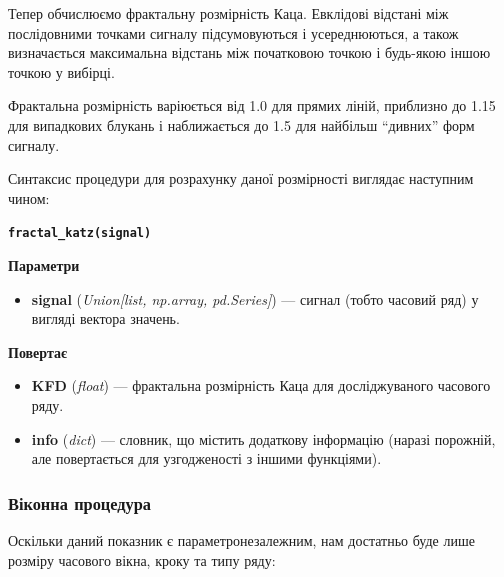 \documentclass[
  letterpaper,
]{report}
\providecommand{\tightlist}{%
  \setlength{\itemsep}{0pt}\setlength{\parskip}{0pt}}\usepackage{longtable,booktabs,array}
\begin{document}
Тепер обчислюємо фрактальну розмірність Каца. Евклідові відстані між
послідовними точками сигналу підсумовуються і усереднюються, а також
визначається максимальна відстань між початковою точкою і будь-якою
іншою точкою у вибірці.

Фрактальна розмірність варіюється від 1.0 для прямих ліній, приблизно до
1.15 для випадкових блукань і наближається до 1.5 для найбільш
``дивних'' форм сигналу.

Синтаксис процедури для розрахунку даної розмірності виглядає наступним
чином:

\textbf{\texttt{fractal\_katz(signal)}}

\textbf{Параметри}

\begin{itemize}
\tightlist
\item
  \textbf{signal} (\emph{Union{[}list, np.array, pd.Series{]}}) ---
  сигнал (тобто часовий ряд) у вигляді вектора значень.
\end{itemize}

\textbf{Повертає}

\begin{itemize}
\tightlist
\item
  \textbf{KFD} (\emph{float}) --- фрактальна розмірність Каца для
  досліджуваного часового ряду.
\item
  \textbf{info} (\emph{dict}) --- словник, що містить додаткову
  інформацію (наразі порожній, але повертається для узгодженості з
  іншими функціями).
\end{itemize}

\hypertarget{ux432ux456ux43aux43eux43dux43dux430-ux43fux440ux43eux446ux435ux434ux443ux440ux430-5}{%
\subsubsection{Віконна
процедура}\label{ux432ux456ux43aux43eux43dux43dux430-ux43fux440ux43eux446ux435ux434ux443ux440ux430-5}}

Оскільки даний показник є параметронезалежним, нам достатньо буде лише
розміру часового вікна, кроку та типу ряду:
\end{document}
